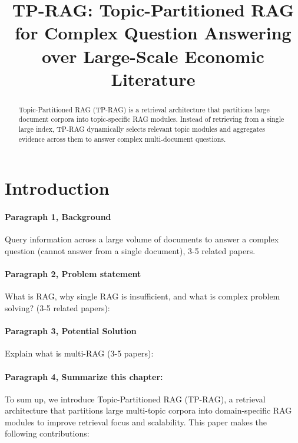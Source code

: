 \documentclass[11pt]{article}
\title{TP-RAG: Topic-Partitioned RAG for Complex Question Answering over Large-Scale Economic Literature}
\begin{document}
\maketitle
\begin{abstract}


Topic-Partitioned RAG (TP-RAG) is a retrieval architecture that partitions large document corpora into topic-specific RAG modules. Instead of retrieving from a single large index, TP-RAG dynamically selects relevant topic modules and aggregates evidence across them to answer complex multi-document questions.

\end{abstract}

\section{Introduction}



\paragraph{Paragraph 1, Background} 

Query information across a large volume of documents to answer a complex question (cannot answer from a single document), 3-5 related papers.

\paragraph{Paragraph 2, Problem statement} 

What is RAG, why single RAG is insufficient, and what is complex problem solving? (3-5 related papers):

\paragraph{Paragraph 3, Potential Solution} 

Explain what is multi-RAG (3-5 papers):

\paragraph{Paragraph 4, Summarize this chapter:} 
To sum up, we introduce Topic-Partitioned RAG (TP-RAG), a retrieval architecture that partitions large multi-topic corpora into domain-specific RAG modules to improve retrieval focus and scalability. This paper makes the following contributions:
\end{document}
